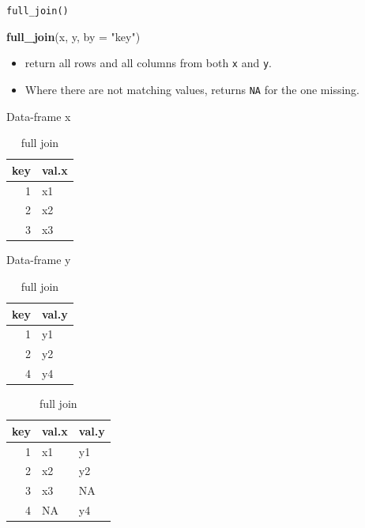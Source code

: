 \documentclass[ignorenonframetext,]{beamer}
\newenvironment{Shaded}{\begin{snugshade}}{\end{snugshade}}
\newcommand{\KeywordTok}[1]{\textcolor[rgb]{0.13,0.29,0.53}{\textbf{#1}}}
\newcommand{\DataTypeTok}[1]{\textcolor[rgb]{0.13,0.29,0.53}{#1}}
\newcommand{\StringTok}[1]{\textcolor[rgb]{0.31,0.60,0.02}{#1}}
\newcommand{\NormalTok}[1]{#1}
\providecommand{\tightlist}{%
  \setlength{\itemsep}{0pt}\setlength{\parskip}{0pt}}
\let\oldShaded\Shaded
\let\endoldShaded\endShaded
\renewenvironment{Shaded}{\footnotesize\oldShaded}{\endoldShaded}
\begin{document}
\begin{frame}[fragile]{\texttt{full\_join()}}

\begin{Shaded}
\begin{Highlighting}[]
\KeywordTok{full_join}\NormalTok{(x, y, }\DataTypeTok{by =} \StringTok{"key"}\NormalTok{)}
\end{Highlighting}
\end{Shaded}

\begin{itemize}
\tightlist
\item
  return all rows and all columns from both \texttt{x} and \texttt{y}.
\item
  Where there are not matching values, returns \texttt{NA} for the one
  missing.
\end{itemize}

\begin{table}[!htb]
    \begin{minipage}{.33\linewidth}
      \caption*{Data-frame x}
      \centering 
\begin{tabular}{rl}
\toprule
key & val.x\\
\midrule
1 & x1\\
2 & x2\\
3 & x3\\
\bottomrule
\end{tabular} \end{minipage}%
    \begin{minipage}{.33\linewidth}
      \centering
        \caption*{Data-frame y} 
\begin{tabular}{rl}
\toprule
key & val.y\\
\midrule
1 & y1\\
2 & y2\\
4 & y4\\
\bottomrule
\end{tabular} \end{minipage}%
    \begin{minipage}{.33\linewidth}
      \centering
        \caption*{full join} 
\begin{tabular}{rll}
\toprule
key & val.x & val.y\\
\midrule
1 & x1 & y1\\
2 & x2 & y2\\
3 & x3 & NA\\
4 & NA & y4\\
\bottomrule
\end{tabular} \end{minipage} 
\end{table}

\end{frame}
\end{document}

